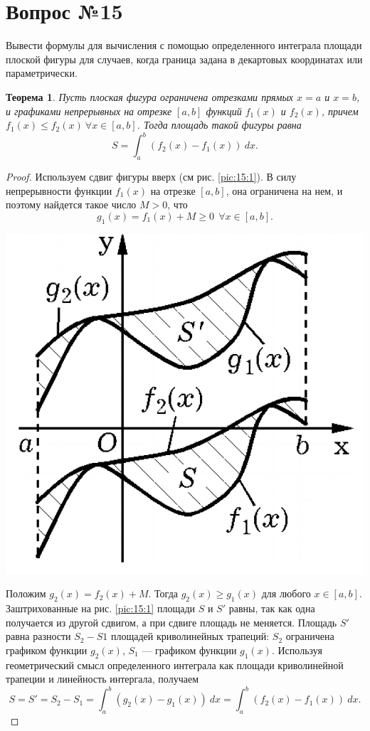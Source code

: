 \documentclass[12pt]{report}
\numberwithin{equation}{section}
\newtheorem{theorem}{Теорема}[section]
\begin{document}
\newpage \section{Вопрос №15} %
\begin{framed}
Вывести формулы для вычисления с помощью определенного интеграла площади плоской
фигуры для случаев, когда граница задана в декартовых координатах или параметрически.
\end{framed}

\begin{theorem} \label{th:15:1}
 Пусть плоская фигура ограничена отрезками прямых $x = a$ и $x = b$, и графиками непрерывных на отрезке $[a,b]$ функций $f_1(x)$ и $f_2(x)$, причем $f_1(x) \leqslant f_2(x)~ \forall x \in [a,b]$. Тогда площадь такой фигуры равна
\[S = \int_a^b (f_2(x) - f_1(x))~dx. \]
\end{theorem}
\begin{proof}
Используем сдвиг фигуры вверх (см рис. \ref{pic:15:1}). В силу непрерывности функции $f_1(x)$ на отрезке $[a,b]$, она ограничена на нем, и поэтому найдется такое число $M > 0$, что 
\[ g_1(x) = f_1(x) + M \geqslant 0 ~~ \forall x \in [a,b].\]

\begin{center}
\includegraphics[scale=0.2]{pic15_1.png} \label{pic:15:1}
\end{center}

Положим $g_2(x) = f_2(x) + M$. Тогда $g_2(x) \geqslant g_1(x)$ для любого $x \in [a,b]$. Заштрихованные на рис. \ref{pic:15:1} площади $S$ и $S'$ равны, так как одна получается из другой сдвигом, а при сдвиге площадь не меняется. Площадь $S'$ равна разности $S_2 - S1$ площадей криволинейных трапеций: $S_2$ ограничена графиком функции $g_2(x)$, $S_1$ --- графиком функции $g_1(x)$. Используя геометрический смысл определенного интеграла как площади криволинейной трапеции и линейность интергала, получаем
\[ S = S' = S_2 - S_1 = \int_a^b (g_2(x) - g_1(x)) ~dx = \int_a^b (f_2(x) - f_1(x)) ~dx.\]
\end{proof}
\end{document}

